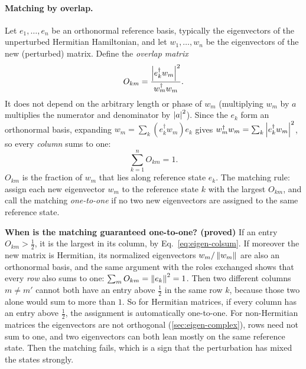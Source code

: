 \paragraph{Matching by overlap.} Let $e_1,\dots,e_n$ be an orthonormal reference basis, typically the eigenvectors of the unperturbed Hermitian Hamiltonian, and let $w_1,\dots,w_n$ be the eigenvectors of the new (perturbed) matrix. Define the \emph{overlap matrix}
\begin{equation}
O_{km}=\frac{\left\lvert e_k^\dagger w_m\right\rvert^2}{w_m^\dagger w_m}.
\label{eq:eigen-overlap}
\end{equation}
It does not depend on the arbitrary length or phase of $w_m$ (multiplying $w_m$ by $a$ multiplies the numerator and denominator by $\left\lvert a\right\rvert^2$). Since the $e_k$ form an orthonormal basis, expanding $w_m=\sum_k(e_k^\dagger w_m)e_k$ gives $w_m^\dagger w_m=\sum_k\left\lvert e_k^\dagger w_m\right\rvert^2$, so every \emph{column} sums to one:
\begin{equation}
\sum_{k=1}^nO_{km}=1.
\label{eq:eigen-colsum}
\end{equation}
$O_{km}$ is the fraction of $w_m$ that lies along reference state $e_k$. The matching rule: assign each new eigenvector $w_m$ to the reference state $k$ with the largest $O_{km}$, and call the matching \emph{one-to-one} if no two new eigenvectors are assigned to the same reference state.

\textbf{When is the matching guaranteed one-to-one? (proved)} If an entry $O_{km}>\tfrac12$, it is the largest in its column, by Eq.~\eqref{eq:eigen-colsum}. If moreover the new matrix is Hermitian, its normalized eigenvectors $w_m/\left\lVert w_m\right\rVert$ are also an orthonormal basis, and the same argument with the roles exchanged shows that every \emph{row} also sums to one: $\sum_mO_{km}=\left\lVert e_k\right\rVert^2=1$. Then two different columns $m\ne m'$ cannot both have an entry above $\tfrac12$ in the same row $k$, because those two alone would sum to more than $1$. So for Hermitian matrices, if every column has an entry above $\tfrac12$, the assignment is automatically one-to-one. For non-Hermitian matrices the eigenvectors are not orthogonal (\cref{sec:eigen-complex}), rows need not sum to one, and two eigenvectors can both lean mostly on the same reference state. Then the matching fails, which is a sign that the perturbation has mixed the states strongly.

